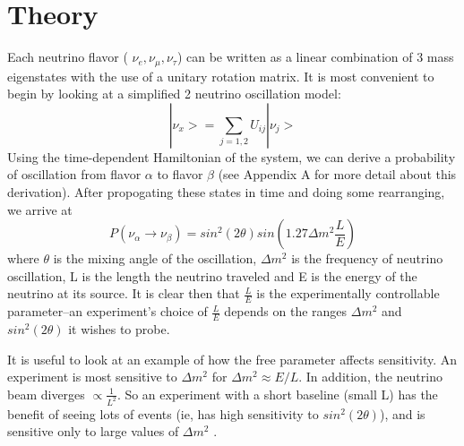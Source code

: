 \documentclass[12pt]{article}
\begin{document}
\section{Theory}

\par Each neutrino flavor ( $\nu_e, \nu_\mu, \nu_\tau$) can be written as a linear combination of 3 mass eigenstates with the use of a unitary rotation matrix. It is most convenient to begin by looking at a simplified 2 neutrino oscillation model:
\begin{equation} \label{eq:eig}
|\nu_x> = \sum_{j=1,2} U_{ij} |\nu_j>  
\end{equation}
Using the time-dependent Hamiltonian of the system, we can derive a probability of oscillation from flavor $\alpha$ to flavor $\beta$ (see Appendix A for more detail about this derivation).  After propogating these states in time and doing some rearranging, we arrive at 
\begin{equation} \label{eq:prob}
P(\nu_\alpha \rightarrow \nu_\beta) = sin^2(2\theta)sin(1.27\Delta m^2  \frac{L}{E})
\end{equation}
where $\theta$ is the mixing angle of the oscillation, $\Delta m^2$ is the frequency of neutrino oscillation, L is the length the neutrino traveled and E is the energy of the neutrino at its source.  It is clear then that $\frac{L}{E}$ is the experimentally controllable parameter--an experiment's choice of $\frac{L}{E}$ depends on the ranges $\Delta m^2$ and $sin^2(2\theta)$ it wishes to probe. 
\par It is useful to look at an example of how the free parameter affects sensitivity.  An experiment is most sensitive to $\Delta m^2$ for $\Delta m^2 \approx E/L$.  In addition, the neutrino beam diverges $\propto \frac{1}{L^2}$.  So an experiment with a short baseline (small L) has the benefit of seeing lots of events (ie, has high sensitivity to $sin^2(2\theta)$), and is sensitive only to large values of $\Delta m^2$ \cite{warwick}. 
\end{document}

